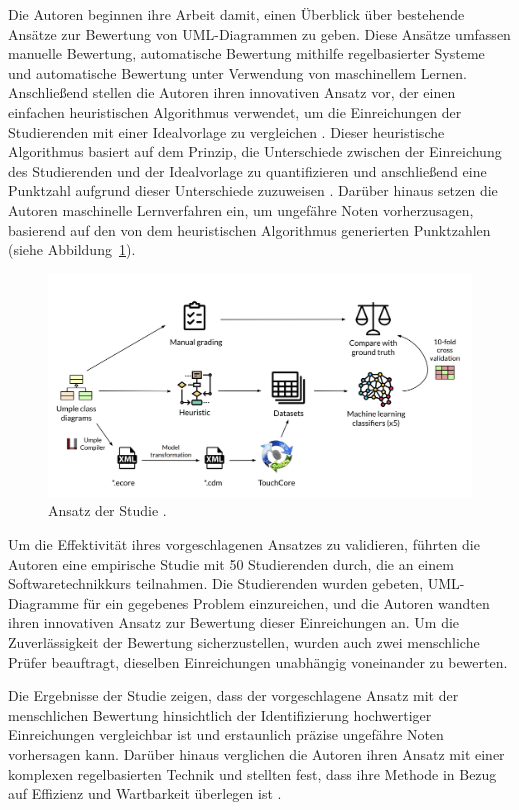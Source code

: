 Die Autoren beginnen ihre Arbeit damit, einen Überblick über bestehende Ansätze zur Bewertung von UML-Diagrammen zu geben. Diese Ansätze umfassen manuelle Bewertung, automatische Bewertung mithilfe regelbasierter Systeme und automatische Bewertung unter Verwendung von maschinellem Lernen. Anschließend stellen die Autoren ihren innovativen Ansatz vor, der einen einfachen heuristischen Algorithmus verwendet, um die Einreichungen der Studierenden mit einer Idealvorlage zu vergleichen \cite{boubekeur2020automatic}. Dieser heuristische Algorithmus basiert auf dem Prinzip, die Unterschiede zwischen der Einreichung des Studierenden und der Idealvorlage zu quantifizieren und anschließend eine Punktzahl aufgrund dieser Unterschiede zuzuweisen \cite{huyck1993efficient}. Darüber hinaus setzen die Autoren maschinelle Lernverfahren ein, um ungefähre Noten vorherzusagen, basierend auf den von dem heuristischen Algorithmus generierten Punktzahlen (siehe Abbildung~\ref{fig:ml-approach}).

\begin{figure}
	\centering
	\includegraphics[width=14cm]{images/ml-approach.png}
	\caption{Ansatz der Studie \cite{boubekeur2020automatic}.}
	\label{fig:ml-approach}
\end{figure}

Um die Effektivität ihres vorgeschlagenen Ansatzes zu validieren, führten die Autoren eine empirische Studie mit 50 Studierenden durch, die an einem Softwaretechnikkurs teilnahmen. Die Studierenden wurden gebeten, UML-Diagramme für ein gegebenes Problem einzureichen, und die Autoren wandten ihren innovativen Ansatz zur Bewertung dieser Einreichungen an. Um die Zuverlässigkeit der Bewertung sicherzustellen, wurden auch zwei menschliche Prüfer beauftragt, dieselben Einreichungen unabhängig voneinander zu bewerten.

Die Ergebnisse der Studie zeigen, dass der vorgeschlagene Ansatz mit der menschlichen Bewertung hinsichtlich der Identifizierung hochwertiger Einreichungen vergleichbar ist und erstaunlich präzise ungefähre Noten vorhersagen kann. Darüber hinaus verglichen die Autoren ihren Ansatz mit einer komplexen regelbasierten Technik und stellten fest, dass ihre Methode in Bezug auf Effizienz und Wartbarkeit überlegen ist \cite{boubekeur2020automatic}.


